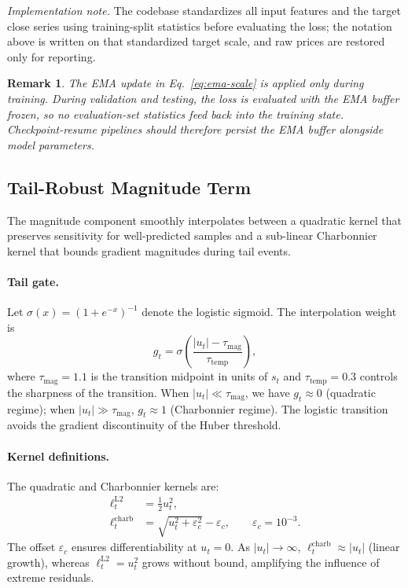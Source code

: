 \documentclass[11pt]{article}
\newtheorem{remark}{Remark}
\begin{document}
\emph{Implementation note.} The codebase standardizes all input
features and the target close series using training-split statistics
before evaluating the loss; the notation above is written on that
standardized target scale, and raw prices are restored only for
reporting.

\begin{remark}
\normalfont
The EMA update in Eq.~\eqref{eq:ema-scale} is applied only during
training. During validation and testing, the loss is evaluated with
the EMA buffer frozen, so no evaluation-set statistics feed back into
the training state. Checkpoint-resume pipelines should therefore
persist the EMA buffer alongside model parameters.
\end{remark}

\subsection{Tail-Robust Magnitude Term}
\label{ssec:magnitude}

The magnitude component smoothly interpolates between a quadratic
kernel that preserves sensitivity for well-predicted samples and a
sub-linear Charbonnier kernel that bounds gradient magnitudes during
tail events.

\paragraph{Tail gate.}
Let $\sigma(x) = (1+e^{-x})^{-1}$ denote the logistic sigmoid. The
interpolation weight is
\begin{equation}
  g_t
  = \sigma\!\left(\frac{|u_t| - \tau_{\mathrm{mag}}}{\tau_{\mathrm{temp}}}\right),
  \label{eq:tail-gate}
\end{equation}
where $\tau_{\mathrm{mag}} = 1.1$ is the transition midpoint in units
of $s_t$ and $\tau_{\mathrm{temp}} = 0.3$ controls the sharpness of
the transition. When $|u_t| \ll \tau_{\mathrm{mag}}$, we have
$g_t \approx 0$ (quadratic regime); when $|u_t| \gg \tau_{\mathrm{mag}}$,
$g_t \approx 1$ (Charbonnier regime). The logistic transition avoids
the gradient discontinuity of the Huber threshold.

\paragraph{Kernel definitions.}
The quadratic and Charbonnier kernels are:
\begin{align}
  \ell_t^{\mathrm{L2}}
  &= \tfrac{1}{2}u_t^2,
  \label{eq:l2-kernel}\\[2pt]
  \ell_t^{\mathrm{charb}}
  &= \sqrt{u_t^2 + \varepsilon_c^2} - \varepsilon_c,
  \qquad \varepsilon_c = 10^{-3}.
  \label{eq:charb-kernel}
\end{align}
The offset $\varepsilon_c$ ensures differentiability at $u_t = 0$.
As $|u_t| \to \infty$, $\ell_t^{\mathrm{charb}} \approx |u_t|$
(linear growth), whereas $\ell_t^{\mathrm{L2}} = u_t^2$ grows
without bound, amplifying the influence of extreme residuals.
\end{document}
